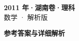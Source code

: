 \documentclass[zihao=-4, a4paper]{ctexart}
\begin{document}
\begin{center}
  {\Large\bfseries 2011 年·湖南卷·理科}\\[4pt]
  {\large 数学 · 解析版}
\end{center}
\medskip
{}

\clearpage
{}
\begin{center}{\Large\bfseries 参考答案与详细解析}\end{center}
\medskip

\end{document}
